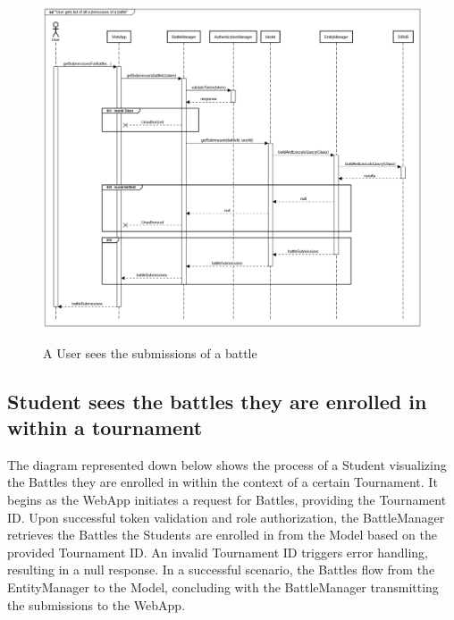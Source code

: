 \documentclass{Configuration_Files/Template}
\begin{document}
\begin{figure}[H]
\centering
\includegraphics[scale = 0.33]{Images/diagrams/sequences/getBattleSubmissions.png}\\
\caption{A User sees the submissions of a battle}
\end{figure}

\subsection*{Student sees the battles they are enrolled in within a tournament}

The diagram represented down below shows the process of a Student visualizing the Battles they are enrolled in within the context of a certain Tournament. It begins as the WebApp initiates a request for Battles, providing the Tournament ID. Upon successful token validation and role authorization, the BattleManager retrieves the Battles the Students are enrolled in from the Model based on the provided Tournament ID. An invalid Tournament ID triggers error handling, resulting in a null response. In a successful scenario, the Battles flow from the EntityManager to the Model, concluding with the BattleManager transmitting the submissions to the WebApp.
\end{document}
